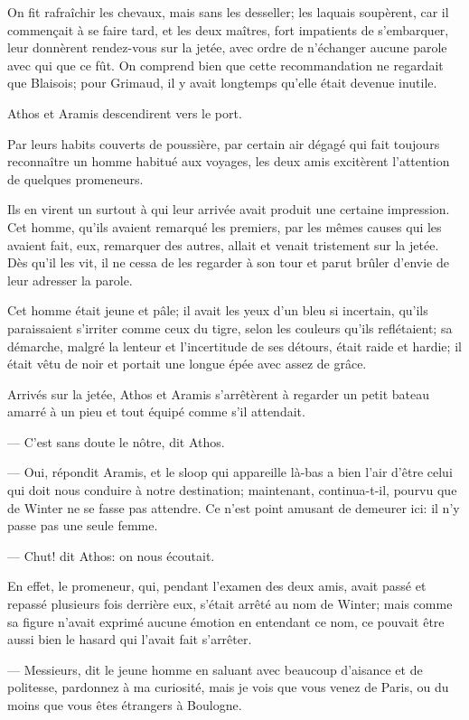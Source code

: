 On fit rafraîchir les chevaux, mais sans les desseller; les laquais soupèrent, car il commençait à se faire tard, et les deux maîtres, fort impatients de s'embarquer, leur donnèrent rendez-vous sur la jetée, avec ordre de n'échanger aucune parole avec qui que ce fût. On comprend bien que cette recommandation ne regardait que Blaisois; pour Grimaud, il y avait longtemps qu'elle était devenue inutile.

Athos et Aramis descendirent vers le port.

Par leurs habits couverts de poussière, par certain air dégagé qui fait toujours reconnaître un homme habitué aux voyages, les deux amis excitèrent l'attention de quelques promeneurs.

Ils en virent un surtout à qui leur arrivée avait produit une certaine impression. Cet homme, qu'ils avaient remarqué les premiers, par les mêmes causes qui les avaient fait, eux, remarquer des autres, allait et venait tristement sur la jetée. Dès qu'il les vit, il ne cessa de les regarder à son tour et parut brûler d'envie de leur adresser la parole.

Cet homme était jeune et pâle; il avait les yeux d'un bleu si incertain, qu'ils paraissaient s'irriter comme ceux du tigre, selon les couleurs qu'ils reflétaient; sa démarche, malgré la lenteur et l'incertitude de ses détours, était raide et hardie; il était vêtu de noir et portait une longue épée avec assez de grâce.

Arrivés sur la jetée, Athos et Aramis s'arrêtèrent à regarder un petit bateau amarré à un pieu et tout équipé comme s'il attendait.

— C'est sans doute le nôtre, dit Athos.

— Oui, répondit Aramis, et le sloop qui appareille là-bas a bien l'air d'être celui qui doit nous conduire à notre destination; maintenant, continua-t-il, pourvu que de Winter ne se fasse pas attendre. Ce n'est point amusant de demeurer ici: il n'y passe pas une seule femme.

— Chut! dit Athos: on nous écoutait.

En effet, le promeneur, qui, pendant l'examen des deux amis, avait passé et repassé plusieurs fois derrière eux, s'était arrêté au nom de Winter; mais comme sa figure n'avait exprimé aucune émotion en entendant ce nom, ce pouvait être aussi bien le hasard qui l'avait fait s'arrêter.

— Messieurs, dit le jeune homme en saluant avec beaucoup d'aisance et de politesse, pardonnez à ma curiosité, mais je vois que vous venez de Paris, ou du moins que vous êtes étrangers à Boulogne.

